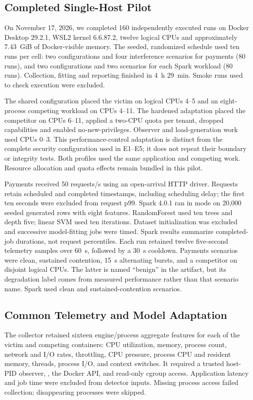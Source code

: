 \subsection{Completed Single-Host Pilot}
\label{sec:pilot}
On November 17, 2026, we completed 160 independently executed runs on Docker
Desktop 29.2.1, WSL2 kernel 6.6.87.2, twelve logical CPUs and approximately
7.43~GiB of Docker-visible memory. The seeded, randomized schedule used ten
runs per cell: two configurations and four interference scenarios for payments
(80 runs), and two configurations and two scenarios for each Spark workload
(80 runs). Collection, fitting and reporting finished in 4~h 29~min.
Smoke runs used to check execution were excluded.

The shared configuration placed the victim on logical CPUs 4--5 and an
eight-process competing workload on CPUs 4--11. The hardened adaptation
placed the competitor on CPUs 6--11, applied a two-CPU quota per tenant,
dropped capabilities and enabled no-new-privileges. Observer and load-generation
work used CPUs 0--3. This performance-control adaptation is distinct from the
complete security configuration used in E1--E5; it does not repeat their boundary
or integrity tests. Both profiles used the same application and competing work.
Resource allocation and quota effects remain bundled in this pilot.

Payments received 50 requests/s using an open-arrival HTTP driver. Requests
retain scheduled and completed timestamps, including scheduling delay; the first
ten seconds were excluded from request p99. Spark 4.0.1 ran in 
mode on 20,000 seeded generated rows with eight features. RandomForest used ten
trees and depth five; linear SVM used ten iterations. Dataset initialization was
excluded and successive model-fitting jobs were timed. Spark results summarize
completed-job durations, not request percentiles. Each run retained twelve
five-second telemetry samples over 60~s, followed by a 30~s cooldown.
Payments scenarios were clean, sustained contention, 15~s alternating bursts,
and a competitor on disjoint logical CPUs. The latter is named ``benign'' in
the artifact, but its degradation label comes from measured performance rather
than that scenario name. Spark used clean and sustained-contention scenarios.

\subsection{Common Telemetry and Model Adaptation}
The collector retained sixteen engine/process aggregate features for each of
the victim and competing containers: CPU utilization, memory, process count,
network and I/O rates, throttling, CPU pressure, process CPU and resident memory,
threads, process I/O, and context switches. It required a trusted host-PID
observer, , the Docker API, and read-only cgroup access.
Application latency and job time were excluded from detector inputs.
Missing process access failed collection; disappearing processes were skipped.

